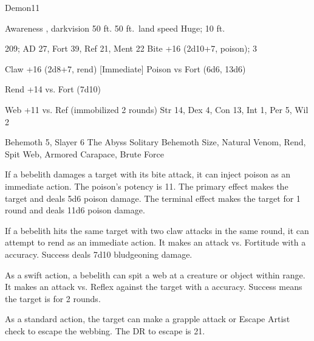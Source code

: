     \begin{monsection}[Bebelith]{Demon}{11}
        \begin{spellcontent}
            \begin{spelltargetinginfo}
                \pari {} Awareness , darkvision 50 ft.
                \pari {} 50 ft.\ land speed
                \pari {} Huge;  10 ft.
            \end{spelltargetinginfo}
            \begin{spelleffects}
                \pari {} 209;  AD 27, Fort 39, Ref 21, Ment 22
                \pari {} Bite +16 (2d10+7, poison);  3
                \par Claw +16 (2d8+7, rend)
                \pari {} [Immediate] Poison  vs Fort (6d6, 13d6)
                \par [Immediate] Rend +14 vs. Fort (7d10)
                \par [Swift] Web +11 vs. Ref (immobilized 2 rounds)
                \pari {} Str 14, Dex 4, Con 13, Int 1, Per 5, Wil 2
            \end{spelleffects}
        \end{spellcontent}
        \begin{spellfooter}
            \pari {} Behemoth 5, Slayer 6
            \pari {} The Abyss
            \pari {} Solitary
            \pari {} Behemoth Size, Natural Venom, Rend, Spit Web, Armored Carapace, Brute Force
        \end{spellfooter}
    \end{monsection}

     If a bebelith damages a target with its bite attack, it can inject poison as an immediate action.
    The poison's potency is 11.
    The primary effect makes the target \sickened and deals 5d6 poison damage.
    The terminal effect makes the target \nauseated for 1 round and deals 11d6 poison damage.

     If a bebelith hits the same target with two claw attacks in the same round, it can attempt to rend as an immediate action.
    It makes an attack vs. Fortitude with a  accuracy.
    Success deals 7d10 bludgeoning damage.

     As a swift action, a bebelith can spit a web at a creature or object within \rngmed range.
    It makes an attack vs. Reflex against the target with a  accuracy.
    Success means the target is \immobilized for 2 rounds.

    As a standard action, the target can make a grapple attack or Escape Artist check to escape the webbing.
    The DR to escape is 21.
